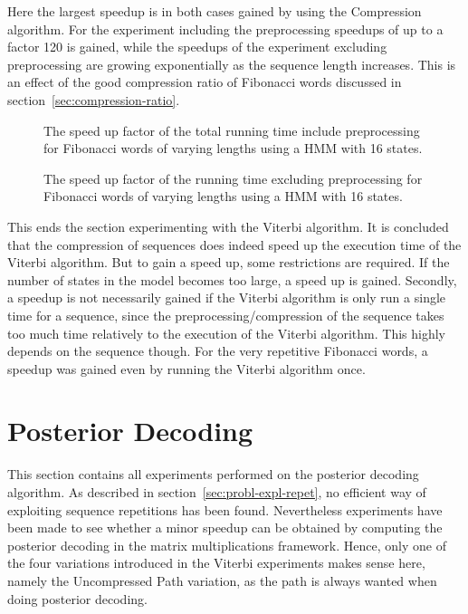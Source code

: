 Here the largest speedup is in both cases gained by using the Compression
algorithm. For the experiment including the preprocessing speedups of up to a
factor 120 is gained, while the speedups of the experiment excluding
preprocessing are growing exponentially as the sequence length
increases. This is an effect of the good compression ratio of Fibonacci words
discussed in section~\ref{sec:compression-ratio}.

\begin{figure}
  \centering
  
  \caption{The speed up factor of the total running time include preprocessing
    for Fibonacci words of varying lengths using a HMM with 16 states.}
  \label{fig:fib_speedup_vs_sequence_length}
\end{figure}

\begin{figure}
  \centering
  
  \caption{The speed up factor of the running time excluding preprocessing for
    Fibonacci words of varying lengths using a HMM with 16 states.}
  \label{fig:fib_speedup_vs_sequence_length2}
\end{figure}

This ends the section experimenting with the Viterbi algorithm. It is concluded
that the compression of sequences does indeed speed up the execution time of
the Viterbi algorithm. But to gain a speed up, some restrictions are
required. If the number of states in the model becomes too large, a speed up is
gained. Secondly, a speedup is not necessarily gained if the Viterbi algorithm
is only run a single time for a sequence, since the preprocessing/compression of
the sequence takes too much time relatively to the execution of the Viterbi
algorithm. This highly depends on the sequence though. For the very repetitive
Fibonacci words, a speedup was gained even by running the Viterbi algorithm once.

\section{Posterior Decoding}
\label{sec:posterior-decoding}

This section contains all experiments performed on the posterior decoding
algorithm. As described in section~\ref{sec:probl-expl-repet}, no efficient way
of exploiting sequence repetitions has been found. Nevertheless experiments
have been made to see whether a minor speedup can be obtained by computing the
posterior decoding in the matrix multiplications framework. Hence, only one of
the four variations introduced in the Viterbi experiments makes sense here,
namely the Uncompressed Path variation, as the path is always wanted when doing
posterior decoding.

